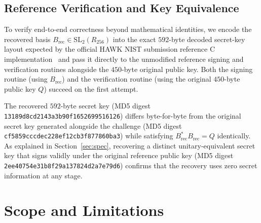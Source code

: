 \documentclass[11pt,a4paper]{article}
\theoremstyle{definition}
\begin{document}
\subsection{Reference Verification and Key Equivalence}
To verify end-to-end correctness beyond mathematical identities, we encode the recovered basis $B_{\mathrm{rec}} \in \mathrm{SL}_2(R_{256})$ into the exact $592$-byte decoded secret-key layout expected by the official HAWK NIST submission reference C implementation~\cite{DPPvW22,HAWK25} and pass it directly to the unmodified reference signing and verification routines alongside the $450$-byte original public key. Both the signing routine (using $B_{\mathrm{rec}}$) and the verification routine (using the original $450$-byte public key $Q$) succeed on the first attempt.

The recovered $592$-byte secret key (MD5 digest \texttt{13189d8cd2143a3b90f1652699516126}) differs byte-for-byte from the original secret key generated alongside the challenge (MD5 digest \texttt{cf5859cccdec228ef12cb3f877860ba3}) while satisfying $B_{\mathrm{rec}}^* B_{\mathrm{rec}} = Q$ identically. As explained in Section~\ref{sec:spec}, recovering a distinct unitary-equivalent secret key that signs validly under the original reference public key (MD5 digest \texttt{2ee40754e31b8f29a137824d2a7e79d6}) confirms that the recovery uses zero secret information at any stage.

\section{Scope and Limitations}
\label{sec:scope}
\end{document}
